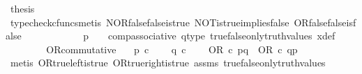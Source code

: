 \begin{isabellebody}
\ {\isacharquery}{\kern0pt}thesis\isanewline
\ \ \ \ \ \ \ \ \isamarkupfalse%
\ {\isacharparenleft}{\kern0pt}typecheck{\isacharunderscore}{\kern0pt}cfuncs{\isacharcomma}{\kern0pt}metis\ NOR{\isacharunderscore}{\kern0pt}false{\isacharunderscore}{\kern0pt}false{\isacharunderscore}{\kern0pt}is{\isacharunderscore}{\kern0pt}true\ NOT{\isacharunderscore}{\kern0pt}is{\isacharunderscore}{\kern0pt}true{\isacharunderscore}{\kern0pt}implies{\isacharunderscore}{\kern0pt}false\ OR{\isacharunderscore}{\kern0pt}false{\isacharunderscore}{\kern0pt}false{\isacharunderscore}{\kern0pt}is{\isacharunderscore}{\kern0pt}false\isanewline
\ \ \ \ \ \ \ \ \ \ \ \ {\isacartoucheopen}p\ {\isacharequal}{\kern0pt}\ {\isasymf}{\isacartoucheclose}\ \ comp{\isacharunderscore}{\kern0pt}associative{}\ q{\isacharunderscore}{\kern0pt}type\ true{\isacharunderscore}{\kern0pt}false{\isacharunderscore}{\kern0pt}only{\isacharunderscore}{\kern0pt}truth{\isacharunderscore}{\kern0pt}values\ x{\isacharunderscore}{\kern0pt}def{\isacharparenright}{\kern0pt}\isanewline
\ \ \ \ \isamarkupfalse%
\isanewline
\ \ \isamarkupfalse%
\isanewline
{}\isamarkupfalse%
%
\endisatagproof
{\isafoldproof}%
%
\isadelimproof
\isanewline
%
\endisadelimproof
\isanewline
{}\isamarkupfalse%
\ OR{\isacharunderscore}{\kern0pt}commutative{\isacharcolon}{\kern0pt}\isanewline
\ \ \ {\isachardoublequoteopen}p\ {\isasymin}\isactrlsub c\ {\isasymOmega}{\isachardoublequoteclose}\isanewline
\ \ \ {\isachardoublequoteopen}q\ {\isasymin}\isactrlsub c\ {\isasymOmega}{\isachardoublequoteclose}\isanewline
\ \ \ {\isachardoublequoteopen}OR\ {\isasymcirc}\isactrlsub c\ {\isasymlangle}p{\isacharcomma}{\kern0pt}q{\isasymrangle}\ {\isacharequal}{\kern0pt}\ OR\ {\isasymcirc}\isactrlsub c\ {\isasymlangle}q{\isacharcomma}{\kern0pt}p{\isasymrangle}{\isachardoublequoteclose}\isanewline
%
\isadelimproof
\ \ %
\endisadelimproof
%
\isatagproof
{}\isamarkupfalse%
\ {\isacharparenleft}{\kern0pt}metis\ OR{\isacharunderscore}{\kern0pt}true{\isacharunderscore}{\kern0pt}left{\isacharunderscore}{\kern0pt}is{\isacharunderscore}{\kern0pt}true\ OR{\isacharunderscore}{\kern0pt}true{\isacharunderscore}{\kern0pt}right{\isacharunderscore}{\kern0pt}is{\isacharunderscore}{\kern0pt}true\ assms\ true{\isacharunderscore}{\kern0pt}false{\isacharunderscore}{\kern0pt}only{\isacharunderscore}{\kern0pt}truth{\isacharunderscore}{\kern0pt}values{\isacharparenright}{\kern0pt}%
\endisatagproof
{\isafoldproof}%
%
\isadelimproof

\end{isabellebody}
